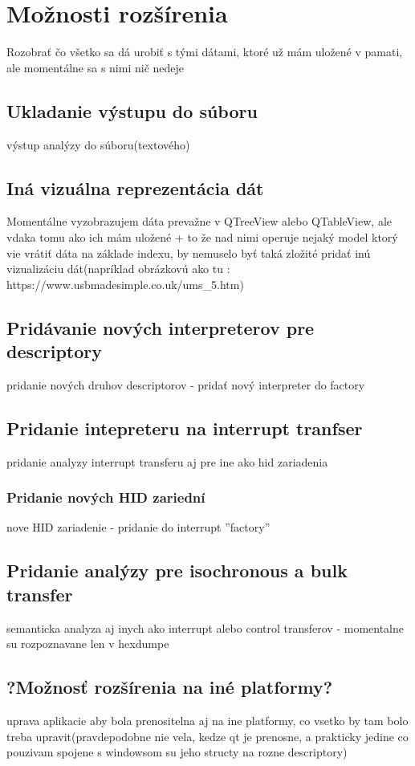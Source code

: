 \chapter{Možnosti rozšírenia}
Rozobrať čo všetko sa dá urobiť s tými dátami, ktoré už mám uložené v pamati, ale momentálne sa s nimi nič nedeje
\section{Ukladanie výstupu do súboru}
výstup analýzy do súboru(textového)
\section{Iná vizuálna reprezentácia dát}
Momentálne vyzobrazujem dáta prevažne v QTreeView alebo QTableView, ale vdaka tomu ako ich mám uložené + to že nad nimi operuje nejaký model ktorý vie vrátiť dáta na základe indexu, by nemuselo byť taká zložité pridať inú vizualizáciu dát(napríklad obrázkovú ako tu : https://www.usbmadesimple.co.uk/ums\_5.htm)
\section{Pridávanie nových interpreterov pre descriptory}
pridanie nových druhov descriptorov - pridať nový interpreter do factory
\section{Pridanie intepreteru na interrupt tranfser}
pridanie analyzy interrupt transferu aj pre ine ako hid zariadenia
\subsection{Pridanie nových HID zariední}
nove HID zariadenie - pridanie do interrupt ''factory''
\section{Pridanie analýzy pre isochronous a bulk transfer}
semanticka analyza aj inych ako interrupt alebo control transferov - momentalne su rozpoznavane len v hexdumpe
\section{?Možnosť rozšírenia na iné platformy?}
uprava aplikacie aby bola prenositelna aj na ine platformy, co vsetko by tam bolo treba upravit(pravdepodobne nie vela, kedze qt je prenosne, a prakticky jedine co pouzivam spojene s windowsom su jeho structy na rozne descriptory)
